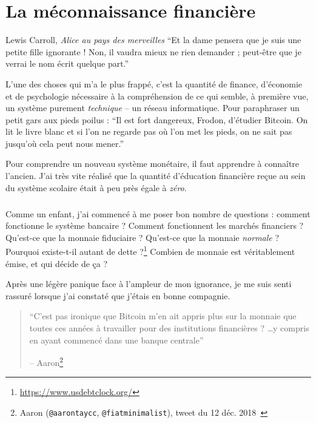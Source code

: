 \chapter{La méconnaissance financière}
\label{les:8}

\begin{chapquote}{Lewis Carroll, \textit{Alice au pays des merveilles}}
\enquote{Et la dame pensera que je suis une petite fille ignorante ! Non, il
vaudra mieux ne rien demander ; peut-être que je verrai le nom écrit quelque
part.}
\end{chapquote}

L'une des choses qui m'a le plus frappé, c'est la quantité de finance,
d'économie et de psychologie nécessaire à la compréhension de ce qui semble, à
première vue, un système purement \textit{technique} -- un réseau informatique.
Pour paraphraser un petit gars aux pieds poilus : \enquote{Il est fort
dangereux, Frodon, d'étudier Bitcoin. On lit le livre blanc et si l'on ne
regarde pas où l'on met les pieds, on ne sait pas jusqu'où cela peut nous
mener.}

Pour comprendre un nouveau système monétaire, il faut apprendre à connaître
l'ancien. J'ai très vite réalisé que la quantité d'éducation financière
reçue au sein du système scolaire était à peu près égale à \textit{zéro}.

\paragraph{}
Comme un enfant, j'ai commencé à me poser bon nombre de questions : comment
fonctionne le système bancaire ? Comment fonctionnent les marchés financiers ?
Qu'est-ce que la monnaie fiduciaire ? Qu'est-ce que la monnaie
\textit{normale} ? Pourquoi existe-t-il autant de
dette ?\footnote{\url{https://www.usdebtclock.org/}} Combien de monnaie est
véritablement émise, et qui décide de ça ?

\newpage

Après une légère panique face à l'ampleur de mon ignorance, je me suis senti
rassuré lorsque j'ai constaté que j'étais en bonne compagnie.

\begin{quotation}\begin{samepage}
\enquote{C'est pas ironique que Bitcoin m'en ait appris plus sur la
monnaie que toutes ces années à travailler pour des institutions financières ?
\ldots y compris en ayant commencé dans une banque centrale}
\begin{flushright} -- Aaron\footnote{Aaron (\texttt{@aarontaycc},
\texttt{@fiatminimalist}), tweet du 12 déc. 2018~\cite{aarontaycc-tweet}}
\end{flushright}\end{samepage}\end{quotation}

